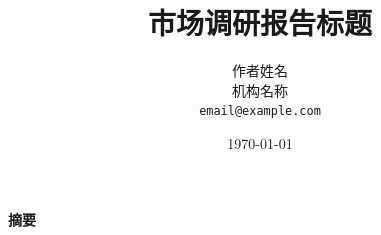 \documentclass{article}
\title{市场调研报告标题}
\author{作者姓名 \\
机构名称 \\
\texttt{email@example.com}}
\date{\today}
\renewenvironment{abstract}{
  \centerline{\large\bfseries 摘要}
  \begin{quote}
}{
  \end{quote}
}
\begin{document}
\maketitle


\begin{abstract}

\end{abstract}











\appendix



\end{document}
